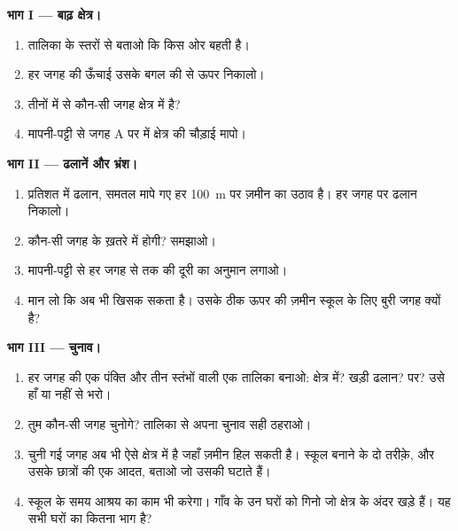 \begin{problem}[{सप्ताहांत समस्या --- वार्डन पहाड़ियों के मानचित्र पर बाढ़ों, खड़ी ढलानों
और भ्रंश से दूर एक नया स्कूल रखा जाता है; अंतिम उत्तर बाढ़ क्षेत्र के अंदर के घरों की
संख्या है}]
\noindent\textbf{भाग I --- बाढ़ क्षेत्र।}\par\nopagebreak
\begin{enumerate}[beginpenalty=10000]
  \item तालिका के  स्तरों से बताओ कि  किस ओर बहती
        है।
  \item हर जगह की ऊँचाई उसके बगल की  से ऊपर निकालो।
  \item तीनों में से कौन-सी जगह  क्षेत्र में है?
  \item मापनी-पट्टी से जगह A पर  में  क्षेत्र की चौड़ाई
        मापो।
\end{enumerate}

\noindent\textbf{भाग II --- ढलानें और भ्रंश।}\par\nopagebreak
\begin{enumerate}[resume, beginpenalty=10000]
  \item प्रतिशत में ढलान, समतल मापे गए हर \qty{100}{m} पर ज़मीन का उठाव है। हर जगह
        पर ढलान निकालो।
  \item कौन-सी जगह  के ख़तरे में होगी? समझाओ।
  \item मापनी-पट्टी से हर जगह से  तक की दूरी का अनुमान
        लगाओ।
  \item मान लो कि  अब भी खिसक सकता है। उसके ठीक ऊपर की ज़मीन स्कूल के लिए बुरी
        जगह क्यों है?
\end{enumerate}

\noindent\textbf{भाग III --- चुनाव।}\par\nopagebreak
\begin{enumerate}[resume, beginpenalty=10000]
  \item हर जगह की एक पंक्ति और तीन स्तंभों वाली एक तालिका बनाओ:  क्षेत्र में?
        खड़ी ढलान?  पर? उसे हाँ या नहीं से भरो।
  \item तुम कौन-सी जगह चुनोगे? तालिका से अपना चुनाव सही ठहराओ।
  \item चुनी गई जगह अब भी ऐसे क्षेत्र में है जहाँ ज़मीन हिल सकती है। स्कूल बनाने के दो
        तरीक़े, और उसके छात्रों की एक आदत, बताओ जो उसकी  घटाते
        हैं।
  \item स्कूल  के समय आश्रय का काम भी करेगा। गाँव के उन घरों को गिनो जो  क्षेत्र के
        अंदर खड़े हैं। यह सभी घरों का कितना भाग है?
\end{enumerate}
\end{problem}
